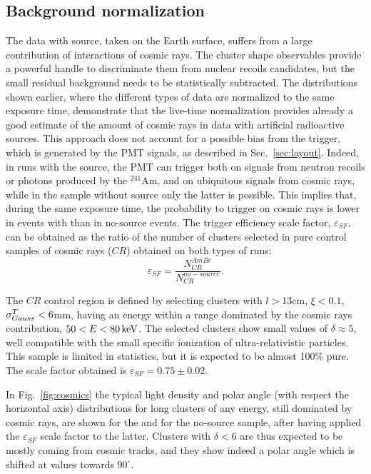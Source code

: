\subsection{Background normalization}
\label{sec:background}
The data with \ambe source, taken on the Earth surface, suffers from a
large contribution of interactions of cosmic rays. The cluster shape
observables provide a powerful handle to discriminate them from nuclear
recoils candidates, but the small residual background needs to be
statistically subtracted. The distributions shown earlier, where the
different types of data are normalized to the same exposure time,
demonstrate that the live-time normalization provides already a good
estimate of the amount of  cosmic rays  in data with artificial
radioactive sources. This approach does not account for a possible bias
from the trigger, which is generated by the PMT signals, as described
in Sec.~\ref{sec:layout}. Indeed, in runs with the \ambe source, the
PMT can trigger both on signals from neutron recoils or photons
produced by the $^{241}$Am, and on ubiquitous signals from cosmic
rays, while in the sample without source only the latter is possible.
This implies that, during the same exposure time, the probability to
trigger on cosmic rays is lower in events with \ambe than in no-source events. The trigger efficiency scale factor,
$\varepsilon_{SF}$, can be obtained as the ratio of the number of
clusters selected in pure control samples of cosmic rays ($CR$)
obtained on both types of runs:
\begin{equation}
\label{eq:sfeff}
\varepsilon_{SF} = \frac{N^{AmBe}_{CR}}{N^{no-source}_{CR}}.
\end{equation}

The $CR$ control region is defined by selecting clusters with
$l>13$\unit{cm}, $\xi<0.1$, $\sigma^T_{Gauss}<6$\unit{mm}, having an energy
within a range dominated by the cosmic rays contribution,
$50<E<80\,\textrm{ke\hspace{-.08em}V}$. The selected clusters show small values of
$\delta\approx5$, well compatible with the small specific ionization
of ultra-relativistic particles.  This sample is limited in
statistics, but it is expected to be almost 100\% pure. The scale
factor obtained is $\varepsilon_{SF}=0.75\pm0.02$.

In Fig.~\ref{fig:cosmics} the typical light density and polar angle
(with respect the horizontal axis) distributions for long clusters of
any energy, still dominated by cosmic rays, are shown for the \ambe
and for the no-source sample, after having applied the
$\varepsilon_{SF}$ scale factor to the latter. Clusters with
$\delta<6$ are thus expected to be mostly coming from cosmic tracks,
and they show indeed a polar angle which is shifted at values towards
$90^\circ$.


